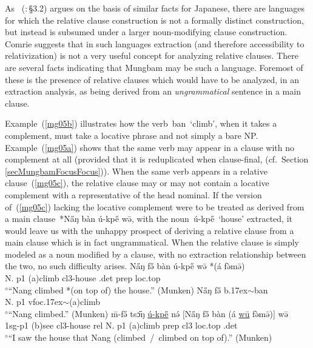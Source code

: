 \documentclass[10pt,twoside]{article}
\makeatletter
\def\ci#1{{\ipaFont #1}}
\newcommand{\gl}[1]{`#1'}
\newcommand{\cl}[1]{{\sc cl#1}}
\newcommand{\citepage}[2]{\citeauthor{#1}~{(\citeyear{#1}:\,{#2})}}
\newcommand{\sref}[1]{Section \ref{#1}}
\def\elicited{$^\diamond$}
\def\til{\raise.17ex\hbox{$\scriptstyle\mathtt{\sim}$}}	%
\def\ML#1{#1\symbol{"1DC6}} %
\newcommand\Lbi{\ipabar{\ipaclap{\i}{\rotatebox{0}{\emph{\raisebox{.06em}{\`{}}}}}}{.5ex}{1.1}{}{}}
\renewcommand{\i}{ı}
\def\@{ə}
\def\aw{ɔ}
\def\ng{ŋ}
\makeatother
\begin{document}
As \citepage{comrie:1998}{\S3.2} argues on the basis of similar facts for Japanese,
there are languages for which the relative clause construction is not a formally
distinct construction, but instead is subsumed under a larger noun-modifying clause
construction. Comrie suggests that in such languages extraction (and therefore
accessibility to relativization) is not a very useful concept for analyzing
relative clauses. 
There are several facts indicating that Mungbam may be such
a language.
Foremost of these is the presence of relative clauses which would have
to be analyzed, in an extraction analysis, as being derived from an {\it ungrammatical}\/ sentence in
a main clause.

Example~(\ref{mg05b})
illustrates how the verb~\ci{ban}~\gl{climb}, when it takes a complement, 
must take a locative phrase and not simply a bare NP. Example~(\ref{mg05a})
shows that the same verb may appear in a clause with no complement at all (provided
that it is reduplicated when clause-final, (cf.~\sref{secMungbamFocusFocus})).
%
When the same verb appears in a relative clause~(\ref{mg05c}), the relative clause may
or may not contain a locative complement with a representative of the
head nominal. If the version of~(\ref{mg05c}) lacking the locative complement
were to be treated as derived from a main clause~*\ci{N\H{a}{\ng} b\`an \'u-kp\H{e} w\={\@}}, with
the noun~\ci{\'u-kp\H{e}}~\gl{house} extracted, it would leave us with
the unhappy prospect of deriving a relative clause from a main clause which
is in fact ungrammatical. When the relative clause is simply modeled as
a noun modified by a clause, with no extraction relationship between the two,
no such difficulty arises.
%
\ea	\gll N\H{a}{\ng} f\H{\@} b\`an \'u-kp\H{e} w\={\@} *(\'a f\`{\@}m\={\@})	\\
N. {\sc p1} ({\sc a})climb \cl3-house {\sc \cl3.det} {\sc  prep} {\sc loc.top}		\\
\glt \elicited``Nang climbed *(on top of) the house.'' (Munken)	\label{mg05b}
\z
\ea	\gll N\H{a}{\ng} f\H{\@} b\Lbi{m}\til{b\ML{a}n}	\\
N. {\sc p1} {\sc vfoc}\til{({\sc a})climb}	\\
\glt \elicited``Nang climbed.'' (Munken)	\label{mg05a}
\z
\ea	\gll \=m-f\H{\@} ts\H{\aw}{\ng} \uline{\'u-kp\H{e}} n\'{\@} $[$N\H{a}{\ng} f\H{\@} b\`an (\'a \uline{w\=u} f\`{\@}m\={\@})$]$ w\={\@}	\\ %
1sg-{\sc p1} ({\sc b})see \cl3-house {\sc rel} N. {\sc p1} ({\sc a})climb {\sc prep} \cl3 {\sc loc.top} {\sc \cl3.det}	\\
\glt \elicited``I saw the house that Nang (climbed~/~climbed on top of).'' (Munken)	\label{mg05c}
\z
\end{document}
